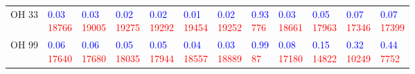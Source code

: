 \begin{tabular}{llllllllllll}
OH 33 & \makecell{\textcolor{blue}{0.03} \\ \textcolor{red}{18766}} & \makecell{\textcolor{blue}{0.03} \\ \textcolor{red}{19005}} & \makecell{\textcolor{blue}{0.02} \\ \textcolor{red}{19275}} & \makecell{\textcolor{blue}{0.02} \\ \textcolor{red}{19292}} & \makecell{\textcolor{blue}{0.01} \\ \textcolor{red}{19454}} & \makecell{\textcolor{blue}{0.02} \\ \textcolor{red}{19252}} & \makecell{\textcolor{blue}{0.93} \\ \textcolor{red}{776}} & \makecell{\textcolor{blue}{0.03} \\ \textcolor{red}{18661}} & \makecell{\textcolor{blue}{0.05} \\ \textcolor{red}{17963}} & \makecell{\textcolor{blue}{0.07} \\ \textcolor{red}{17346}} & \makecell{\textcolor{blue}{0.07} \\ \textcolor{red}{17399}} \\
OH 99 & \makecell{\textcolor{blue}{0.06} \\ \textcolor{red}{17640}} & \makecell{\textcolor{blue}{0.06} \\ \textcolor{red}{17680}} & \makecell{\textcolor{blue}{0.05} \\ \textcolor{red}{18035}} & \makecell{\textcolor{blue}{0.05} \\ \textcolor{red}{17944}} & \makecell{\textcolor{blue}{0.04} \\ \textcolor{red}{18557}} & \makecell{\textcolor{blue}{0.03} \\ \textcolor{red}{18889}} & \makecell{\textcolor{blue}{0.99} \\ \textcolor{red}{87}} & \makecell{\textcolor{blue}{0.08} \\ \textcolor{red}{17180}} & \makecell{\textcolor{blue}{0.15} \\ \textcolor{red}{14822}} & \makecell{\textcolor{blue}{0.32} \\ \textcolor{red}{10249}} & \makecell{\textcolor{blue}{0.44} \\ \textcolor{red}{7752}} \\

\end{tabular}
